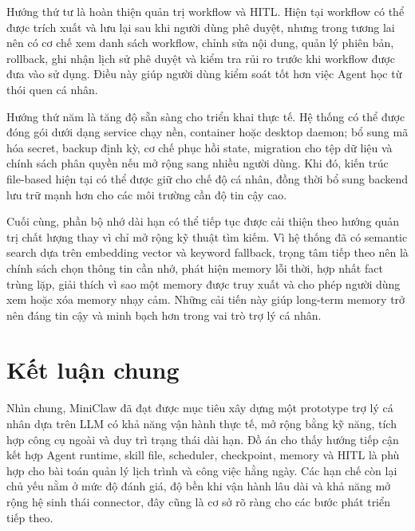 Hướng thứ tư là hoàn thiện quản trị workflow và HITL. Hiện tại workflow có thể được trích xuất và lưu lại sau khi người dùng phê duyệt, nhưng trong tương lai nên có cơ chế xem danh sách workflow, chỉnh sửa nội dung, quản lý phiên bản, rollback, ghi nhận lịch sử phê duyệt và kiểm tra rủi ro trước khi workflow được đưa vào sử dụng. Điều này giúp người dùng kiểm soát tốt hơn việc Agent học từ thói quen cá nhân.

Hướng thứ năm là tăng độ sẵn sàng cho triển khai thực tế. Hệ thống có thể được đóng gói dưới dạng service chạy nền, container hoặc desktop daemon; bổ sung mã hóa secret, backup định kỳ, cơ chế phục hồi state, migration cho tệp dữ liệu và chính sách phân quyền nếu mở rộng sang nhiều người dùng. Khi đó, kiến trúc file-based hiện tại có thể được giữ cho chế độ cá nhân, đồng thời bổ sung backend lưu trữ mạnh hơn cho các môi trường cần độ tin cậy cao.

Cuối cùng, phần bộ nhớ dài hạn có thể tiếp tục được cải thiện theo hướng quản trị chất lượng thay vì chỉ mở rộng kỹ thuật tìm kiếm. Vì hệ thống đã có semantic search dựa trên embedding vector và keyword fallback, trọng tâm tiếp theo nên là chính sách chọn thông tin cần nhớ, phát hiện memory lỗi thời, hợp nhất fact trùng lặp, giải thích vì sao một memory được truy xuất và cho phép người dùng xem hoặc xóa memory nhạy cảm. Những cải tiến này giúp long-term memory trở nên đáng tin cậy và minh bạch hơn trong vai trò trợ lý cá nhân.

\section{Kết luận chung}
Nhìn chung, MiniClaw đã đạt được mục tiêu xây dựng một prototype trợ lý cá nhân dựa trên LLM có khả năng vận hành thực tế, mở rộng bằng kỹ năng, tích hợp công cụ ngoài và duy trì trạng thái dài hạn. Đồ án cho thấy hướng tiếp cận kết hợp Agent runtime, skill file, scheduler, checkpoint, memory và HITL là phù hợp cho bài toán quản lý lịch trình và công việc hằng ngày. Các hạn chế còn lại chủ yếu nằm ở mức độ đánh giá, độ bền khi vận hành lâu dài và khả năng mở rộng hệ sinh thái connector, đây cũng là cơ sở rõ ràng cho các bước phát triển tiếp theo.
